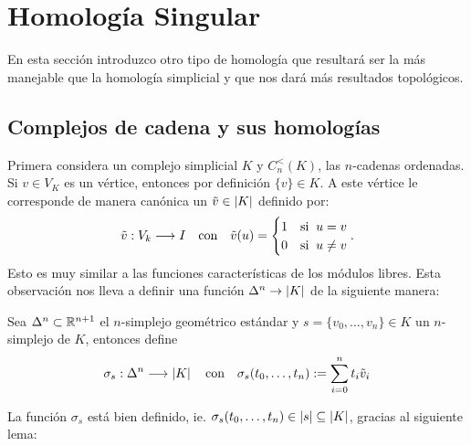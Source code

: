 \documentclass[../../topologia_algebraica]{subfiles}
\begin{document}
\section{Homolog\'ia Singular}

En esta secci\'on introduzco otro tipo de homolog\'ia que resultar\'a ser la m\'as manejable
que la homolog\'ia simplicial y que nos dar\'a m\'as resultados topol\'ogicos.
  
\subsection{Complejos de cadena y sus homolog\'ias}

Primera considera un complejo simplicial $K$ y $C_n^<(K)$, las $n$-cadenas ordenadas.
Si $v\in V_K$ es un v\'ertice, entonces por definici\'on $\{v\}\in K$. A este v\'ertice le
corresponde de manera can\'onica un $\tilde{v}\in\left| K \right|$ definido por:
\[
  \tilde{v}:V_k\longrightarrow I \quad\text{con}\quad \tilde{v}(u)=
  \begin{cases}
    1 & \text{si}\;\; u=v\\
    0 & \text{si}\;\; u\neq v
  \end{cases}.
\]
Esto es muy similar a las funciones caracter\'isticas de los m\'odulos libres. Esta observaci\'on
nos lleva a definir una funci\'on $\Delta^n\rightarrow\left| K \right|$ de la siguiente manera:

\begin{defin}
  Sea $\Delta^n\subset\mathbb{R}^{n+1}$ el $n$-simplejo geom\'etrico est\'andar y $s=\{v_0,\ldots,v_n\}\in K$
  un $n$-simplejo de $K$, entonces define
  \[
    \sigma_s:\Delta^n\longrightarrow \left| K \right| \quad\text{con}\quad \sigma_s(t_0,\ldots,t_n):=\sum_{i=0}^n t_i\tilde{v}_i
  \]
\end{defin}

La funci\'on $\sigma_s$ est\'a bien definido, ie. $\sigma_s(t_0,\ldots,t_n)\in\left| s \right|\subseteq\left| K \right|$,
gracias al siguiente lema:
\end{document}
